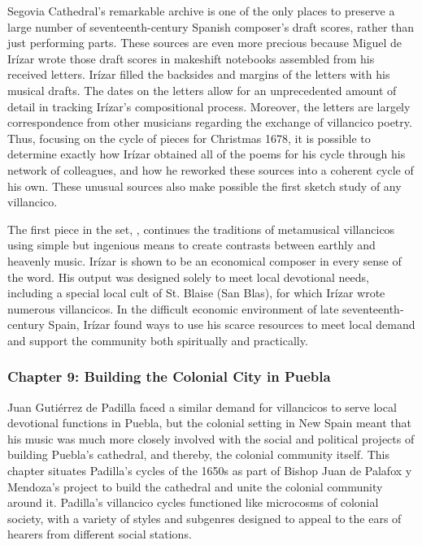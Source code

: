 \documentclass[tt]{vcbook-proposal}
\begin{document}
Segovia Cathedral's remarkable archive is one of the only places to preserve a large number of seventeenth-century Spanish composer's draft scores, rather than just performing parts.
These sources are even more precious because Miguel de Irízar wrote those draft scores in makeshift notebooks assembled from his received letters.
Irízar filled the backsides and margins of the letters with his musical drafts.
The dates on the letters allow for an unprecedented amount of detail in tracking Irízar's compositional process.
Moreover, the letters are largely correspondence from other musicians regarding the exchange of villancico poetry.
Thus, focusing on the cycle of pieces for Christmas 1678, it is possible to determine exactly how Irízar obtained all of the poems for his cycle through his network of colleagues, and how he reworked these sources into a coherent cycle of his own.
These unusual sources also make possible the first sketch study of any villancico.

The first piece in the set, , continues the traditions of metamusical villancicos using simple but ingenious means to create contrasts between earthly and heavenly music.
Irízar is shown to be an economical composer in every sense of the word.
His output was designed solely to meet local devotional needs, including a special local cult of St. Blaise (San Blas), for which Irízar wrote numerous villancicos. 
In the difficult economic environment of late seventeenth-century Spain, Irízar found ways to use his scarce resources to meet local demand and support the community both spiritually and practically.

\subsubsection{Chapter 9: Building the Colonial City in Puebla}

Juan Gutiérrez de Padilla faced a similar demand for villancicos to serve local devotional functions in Puebla, but the colonial setting in New Spain meant that his music was much more closely involved with the social and political projects of building Puebla's cathedral, and thereby, the colonial community itself.
This chapter situates Padilla's cycles of the 1650s as part of Bishop Juan de Palafox y Mendoza's project to build the cathedral and unite the colonial community around it.
Padilla's villancico cycles functioned like microcosms of colonial society, with a variety of styles and subgenres designed to appeal to the ears of hearers from different social stations.
\end{document}
